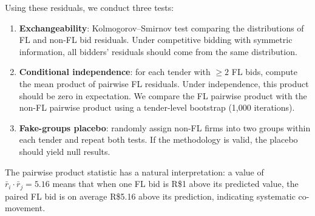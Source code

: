 Using these residuals, we conduct three tests:

\begin{enumerate}
  \item \textbf{Exchangeability}: Kolmogorov--Smirnov test comparing the
    distributions of FL and non-FL bid residuals. Under competitive
    bidding with symmetric information, all bidders' residuals should
    come from the same distribution.
  \item \textbf{Conditional independence}: for each tender with $\geq 2$
    FL bids, compute the mean product of pairwise FL residuals. Under
    independence, this product should be zero in expectation. We compare
    the FL pairwise product with the non-FL pairwise product using a
    tender-level bootstrap (1,000 iterations).
  \item \textbf{Fake-groups placebo}: randomly assign non-FL firms into
    two groups within each tender and repeat both tests. If the
    methodology is valid, the placebo should yield null results.
\end{enumerate}

The pairwise product statistic has a natural interpretation: a value of
$\bar{r}_i \cdot \bar{r}_j = 5.16$ means that when one FL bid is R\$1
above its predicted value, the paired FL bid is on average R\$5.16 above
its prediction, indicating systematic co-movement.
